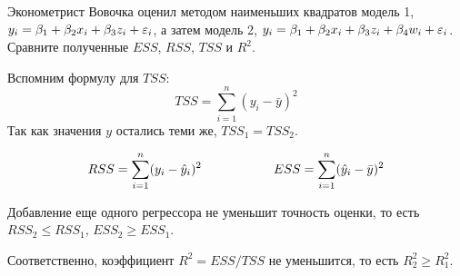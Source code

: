 \begin{problem} %
Эконометрист Вовочка оценил методом наименьших квадратов модель 1, $y_i=\beta_1+\beta_2 x_i+\beta_3 z_i+\varepsilon_i$, 
а затем модель 2, $y_i=\beta_1+\beta_2 x_i+\beta_3 z_i+\beta_4 w_i+\varepsilon_i$. 
Сравните полученные $ESS$, $RSS$, $TSS$ и $R^2$.


\begin{sol}
Вспомним формулу для  $TSS$:
\[
TSS = \sum\limits_{i=1}^n (y_i-\bar{y})^2
\]
Так как значения $y$ остались теми же, $TSS_1 = TSS_2$.

\[
RSS = \sum\limits_{i=1}^n (y_i-\hat{y}_i)^2 \hspace{2cm} ESS = \sum\limits_{i=1}^n (\hat{y}_i-\bar{y})^2
\]

Добавление еще одного регрессора не уменьшит точность оценки, то есть $RSS_2\leqslant RSS_1$, $ESS_2 \geqslant ESS_1$.

Соответственно, коэффициент $R^2 = ESS/TSS$ не уменьшится, то есть $R^2_2 \geqslant R^2_1$.

\end{sol}
\end{problem}





